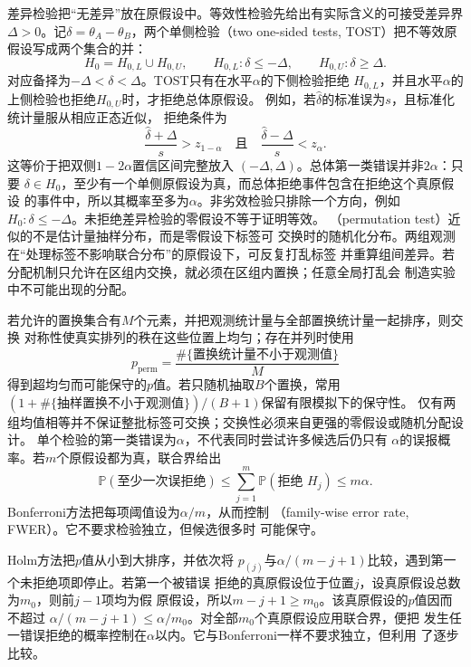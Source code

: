 差异检验把“无差异”放在原假设中。等效性检验先给出有实际含义的可接受差异界
\(\Delta>0\)。记\(\delta=\theta_A-\theta_B\)，两个单侧检验（two one-sided
tests, TOST）把不等效原假设写成两个集合的并：
\[
  H_0=H_{0,L}\cup H_{0,U},
  \qquad
  H_{0,L}:\delta\leq-\Delta,
  \qquad
  H_{0,U}:\delta\geq\Delta.
\]
对应备择为\(-\Delta<\delta<\Delta\)。TOST只有在水平\(\alpha\)的下侧检验拒绝
\(H_{0,L}\)，并且水平\(\alpha\)的上侧检验也拒绝\(H_{0,U}\)时，才拒绝总体原假设。
例如，若\(\widehat\delta\)的标准误为\(s\)，且标准化统计量服从相应正态近似，
拒绝条件为
\begin{equation}
  \frac{\widehat\delta+\Delta}{s}>z_{1-\alpha}
  \quad\text{且}\quad
  \frac{\widehat\delta-\Delta}{s}<z_{\alpha}.
  \label{eq:statistics-tost-rejection}
\end{equation}
这等价于把双侧\(1-2\alpha\)置信区间完整放入
\((-\Delta,\Delta)\)。总体第一类错误并非\(2\alpha\)：只要
\(\delta\in H_0\)，至少有一个单侧原假设为真，而总体拒绝事件包含在拒绝这个真原假设
的事件中，所以其概率至多为\(\alpha\)。非劣效检验只排除一个方向，例如
\(H_0:\delta\leq-\Delta\)。未拒绝差异检验的零假设不等于证明等效。
（permutation test）近似的不是估计量抽样分布，而是零假设下标签可
交换时的随机化分布。两组观测在“处理标签不影响联合分布”的原假设下，可反复打乱标签
并重算组间差异。若分配机制只允许在区组内交换，就必须在区组内置换；任意全局打乱会
制造实验中不可能出现的分配。

若允许的置换集合有\(M\)个元素，并把观测统计量与全部置换统计量一起排序，则交换
对称性使真实排列的秩在这些位置上均匀；存在并列时使用
\[
  p_{\mathrm{perm}}
  =\frac{\#\{\text{置换统计量不小于观测值}\}}{M}
\]
得到超均匀而可能保守的\(p\)值。若只随机抽取\(B\)个置换，常用
\((1+\#\{\text{抽样置换不小于观测值}\})/(B+1)\)保留有限模拟下的保守性。
仅有两组均值相等并不保证整批标签可交换；交换性必须来自更强的零假设或随机分配设计。
单个检验的第一类错误为\(\alpha\)，不代表同时尝试许多候选后仍只有
\(\alpha\)的误报概率。若\(m\)个原假设都为真，联合界给出
\[
  \mathbb{P}(\text{至少一次误拒绝})
  \leq\sum_{j=1}^m\mathbb{P}(\text{拒绝 }H_j)
  \leq m\alpha.
\]
Bonferroni方法把每项阈值设为\(\alpha/m\)，从而控制
（family-wise error rate, FWER）。它不要求检验独立，但候选很多时
可能保守。

Holm方法把\(p\)值从小到大排序，并依次将
\(p_{(j)}\)与\(\alpha/(m-j+1)\)比较，遇到第一个未拒绝项即停止。若第一个被错误
拒绝的真原假设位于位置\(j\)，设真原假设总数为\(m_0\)，则前\(j-1\)项均为假
原假设，所以\(m-j+1\geq m_0\)。该真原假设的\(p\)值因而不超过
\(\alpha/(m-j+1)\leq\alpha/m_0\)。对全部\(m_0\)个真原假设应用联合界，便把
发生任一错误拒绝的概率控制在\(\alpha\)以内。它与Bonferroni一样不要求独立，但利用
了逐步比较。

